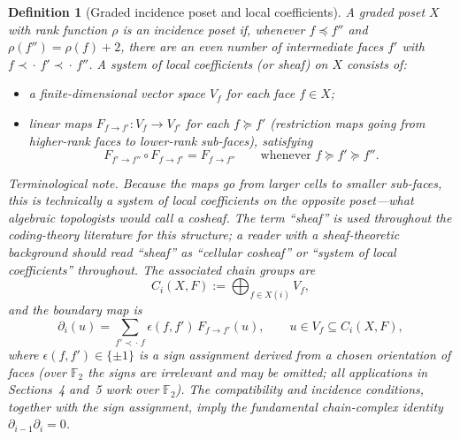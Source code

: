 \documentclass[10pt]{article}
\theoremstyle{compactdef}
\newtheorem{definition}{Definition}
\begin{document}
\begin{definition}[Graded incidence poset and local coefficients]
A graded poset $X$ with rank function $\rho$ is an \emph{incidence poset} if, whenever $f\preceq f''$ and $\rho(f'')=\rho(f)+2$, there are an even number of intermediate faces $f'$ with $f\prec\!\cdot\, f'\prec\!\cdot\, f''$. A system of local coefficients (or sheaf) on $X$ consists of:
\begin{itemize}
\item a finite-dimensional vector space $V_f$ for each face $f\in X$;
\item linear maps $F_{f\to f'}:V_f\to V_{f'}$ for each $f\succeq f'$ (restriction maps going from higher-rank faces to lower-rank sub-faces), satisfying
\[
F_{f'\to f''}\circ F_{f\to f'}=F_{f\to f''}
\qquad\text{whenever }f\succeq f'\succeq f''.
\]
\end{itemize}
\emph{Terminological note.} Because the maps go from larger cells to smaller sub-faces, this is technically a system of local coefficients on the opposite poset---what algebraic topologists would call a \emph{cosheaf}. The term ``sheaf'' is used throughout the coding-theory literature for this structure; a reader with a sheaf-theoretic background should read ``sheaf'' as ``cellular cosheaf'' or ``system of local coefficients'' throughout.
The associated chain groups are
\[
C_i(X,F):=\bigoplus_{f\in X(i)}V_f,
\]
and the boundary map is
\[
\partial_i(u)=\sum_{f'\prec\!\cdot\,f} \epsilon(f,f')\,F_{f\to f'}(u),\qquad u\in V_f\subseteq C_i(X,F),
\]
where $\epsilon(f,f')\in\{\pm 1\}$ is a sign assignment derived from a chosen orientation of faces (over $\mathbb F_2$ the signs are irrelevant and may be omitted; all applications in Sections~4 and~5 work over $\mathbb F_2$).
The compatibility and incidence conditions, together with the sign assignment, imply the fundamental chain-complex identity $\partial_{i-1}\partial_i=0$.~\cite{DLV}
\end{definition}
\end{document}
